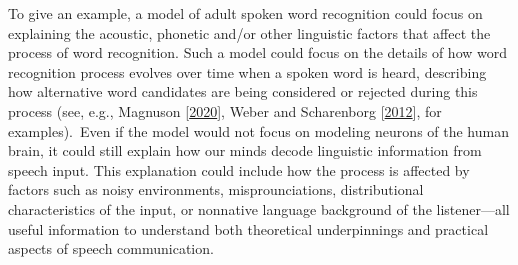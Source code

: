 \documentclass[letterpaper,10pt,english]{jupyterBook}
\begin{document}
\sphinxAtStartPar
To give an example, a model of adult spoken word recognition could focus
on explaining the acoustic, phonetic and/or other linguistic factors
that affect the process of word recognition. Such a model could focus on
the details of how word recognition process evolves over time when a
spoken word is heard, describing how alternative word candidates are
being considered or rejected during this process (see, e.g., Magnuson  {[}\hyperlink{cite.References:id27}{2020}{]}, Weber and Scharenborg {[}\hyperlink{cite.References:id12}{2012}{]}, for examples). Even if the
model would not focus on modeling neurons of the human brain, it could
still explain how our minds decode linguistic information from speech
input. This explanation could include how the process is affected by
factors such as noisy environments, misprounciations, distributional
characteristics of the input, or non\sphinxhyphen{}native language background of the
listener—all useful information to understand both theoretical
underpinnings and practical aspects of speech communication.
\end{document}
